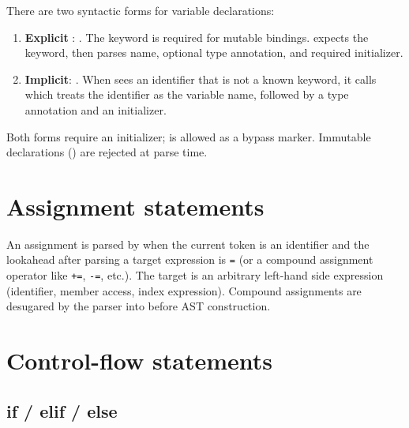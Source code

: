 \pnum
There are two syntactic forms for variable declarations:

\begin{enumerate}
\item \textbf{Explicit }: .  The 
  keyword is required for mutable bindings.   expects the
   keyword, then parses name, optional type annotation, and required
  initializer.
\item \textbf{Implicit}: .  When  sees
  an identifier that is not a known keyword, it calls 
  which treats the identifier as the variable name, followed by a type annotation
  and an initializer.
\end{enumerate}

\pnum
Both forms require an initializer;  is allowed as a
bypass marker.  Immutable declarations () are
rejected at parse time.

\section{Assignment statements}
\label{sec:par-stmt-assign}

\pnum
An assignment is parsed by  when the current token is
an identifier and the lookahead after parsing a target expression is \texttt{=}
(or a compound assignment operator like \texttt{+=}, \texttt{-=}, etc.).  The
target is an arbitrary left-hand side expression (identifier, member access,
index expression).  Compound assignments are desugared by the parser into
 before AST construction.

\section{Control-flow statements}
\label{sec:par-stmt-cf}

\subsection{if / elif / else}
\label{sec:par-stmt-if}

